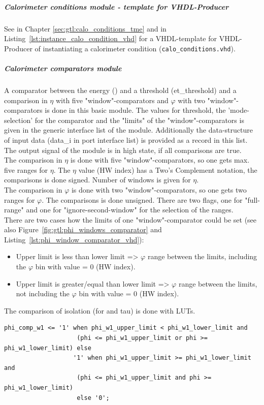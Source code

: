 \clearpage

\subparagraph{Calorimeter conditions module - template for VHDL-Producer}
See in Chapter \ref{sec:gtl:calo_conditions_tme} and in Listing~\ref{lst:instance_calo_condition_vhd} for a VHDL-template for VHDL-Producer of
instantiating a calorimeter condition (\texttt{calo\_conditions.vhd}).\\

\subparagraph{Calorimeter comparators module}\label{sec:gtl:calo_comp_module}
A comparator between the energy (\et) and a threshold (et\_threshold) and a comparison in $\eta$ with five "window"-comparators and $\varphi$ with two "window"-comparators
is done in this basic module. The values for \et threshold, the 'mode-selection' for the \et comparator and the "limits" of the "window"-comparators 
is given in the generic interface list of the module. Additionally the data-structure of input data (data\_i in port interface list) is provided
as a record in this list. The output signal of the module is in high state, if all comparisons are true.\\
The comparison in $\eta$ is done with five "window"-comparators, so one gets max. five ranges for $\eta$. The $\eta$ value (HW index) has a Two's Complement notation, the comparisons is done signed. Number of windows is given for $\eta$.\\
The comparison in $\varphi$ is done with two "window"-comparators, so one gets two ranges for $\varphi$. The comparisons is done unsigned. There are two flags, one for "full-range" and one for "ignore-second-window" for the selection of the ranges.\\
There are two cases how the limits of one "window"-comparator could be set (see also Figure~\ref{fig:gtl:phi_windows_comparator} and Listing~\ref{lst:phi_window_comparator_vhd}):
\begin{itemize}
\item Upper limit is less than lower limit => $\varphi$ range between the limits, including the $\varphi$ bin with value = 0 (HW index).
\item Upper limit is greater/equal than lower limit => $\varphi$ range between the limits, not including the $\varphi$ bin with value = 0 (HW index).
\end{itemize}
The comparison of isolation (for \egamma and tau) is done with LUTs.
\begin{lstlisting}[label=lst:phi_window_comparator_vhd,float=here,caption=VHDL code of "window"-comparator in $\varphi$,captionpos=t]
    phi_comp_w1 <= '1' when phi_w1_upper_limit < phi_w1_lower_limit and
                    (phi <= phi_w1_upper_limit or phi >= phi_w1_lower_limit) else
                   '1' when phi_w1_upper_limit >= phi_w1_lower_limit and
                    (phi <= phi_w1_upper_limit and phi >= phi_w1_lower_limit)
                    else '0';
\end{lstlisting}

